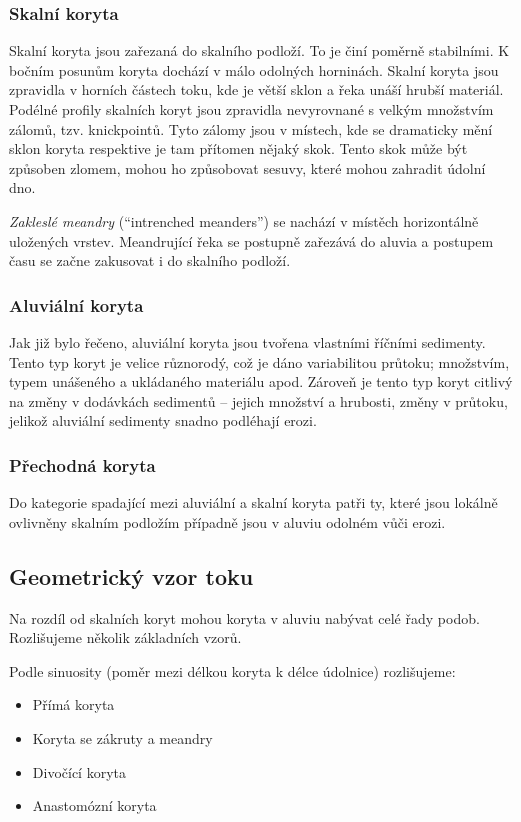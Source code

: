 \subsubsection{Skalní koryta}
Skalní koryta jsou  zařezaná do skalního podloží. To je činí poměrně stabilními. K bočním posunům koryta dochází v málo odolných horninách. Skalní koryta jsou zpravidla v horních částech toku, kde je větší sklon a řeka unáší hrubší materiál. Podélné profily skalních koryt jsou zpravidla nevyrovnané s velkým množstvím zálomů, tzv. knickpointů. Tyto zálomy jsou v místech, kde se dramaticky mění sklon koryta respektive je tam přítomen nějaký skok. Tento skok může být způsoben zlomem, mohou ho způsobovat sesuvy, které mohou zahradit údolní dno. 

\emph{Zakleslé meandry} (\enquote{intrenched meanders}) se nachází v místěch horizontálně uložených vrstev. Meandrující řeka se postupně zařezává do aluvia a postupem času se začne zakusovat i do skalního podloží. 

\subsubsection{Aluviální koryta}
Jak již bylo řečeno, aluviální koryta jsou tvořena vlastními říčními sedimenty. Tento typ koryt je velice různorodý, což je dáno variabilitou průtoku; množstvím, typem unášeného a ukládaného materiálu apod. Zároveň je tento typ koryt citlivý na změny v dodávkách sedimentů -- jejich množství a hrubosti, změny v průtoku, jelikož aluviální sedimenty snadno podléhají erozi. 

\subsubsection{Přechodná koryta}
Do kategorie spadající mezi aluviální a skalní koryta patři ty, které jsou lokálně ovlivněny skalním podložím případně jsou v aluviu odolném vůči erozi.

\subsection{Geometrický vzor toku}
Na rozdíl od skalních koryt mohou koryta v aluviu nabývat celé řady podob. Rozlišujeme několik základních vzorů. 

Podle sinuosity (poměr mezi délkou koryta k délce údolnice) rozlišujeme:

\begin{itemize}
	\item Přímá koryta
	\item Koryta se zákruty a meandry
	\item Divočící koryta
	\item Anastomózní koryta
\end{itemize}

